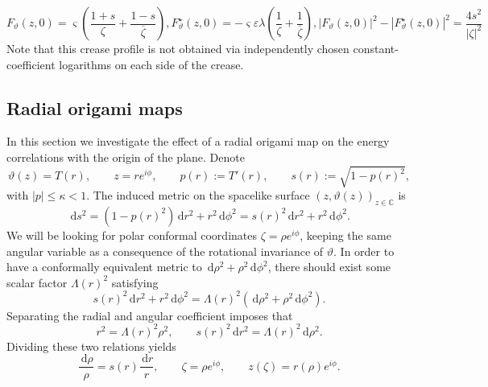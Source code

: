 \documentclass[reqno]{amsart}
\numberwithin{equation}{section}
\theoremstyle{definition}
\theoremstyle{remark}
\providecommand{\dd}{\,\mathrm d}
\begin{document}
\begin{equation}
	 F_\vartheta(z,0)=\varsigma\left(\frac{1+s}{\zeta}+\frac{1-s}{\overline\zeta} \right),  F^\star_\vartheta(z,0)=-\varsigma\varepsilon\lambda\left(
        \frac{1}{\zeta}+\frac{1}{\overline\zeta}\right) ,  |F_\vartheta(z,0)|^2-|F^\star_\vartheta(z,0)|^2
        =\frac{4s^2}{|\zeta|^2}
\end{equation}
Note that this crease profile is not obtained via independently chosen constant-coefficient logarithms on each side of the crease.

\subsection{Radial origami maps} In this section we investigate the effect of a radial origami map on the energy correlations with the origin of the plane. Denote
\begin{equation}\label{eq:radial-profile}
        \vartheta(z)=T(r),
        \qquad z=re^{i\phi},
        \qquad p(r):=T'(r),
        \qquad s(r):=\sqrt{1-p(r)^2},
\end{equation}
with $|p|\leq \kappa<1$.  The induced metric on the spacelike surface $(z,\vartheta(z))_{z\in \mathbb{C}} $ is
\begin{equation}\label{eq:radial-induced-metric}
        \dd s^2=(1-p(r)^2)\dd r^2+r^2\dd\phi^2
        =s(r)^2\dd r^2+r^2\dd\phi^2.
\end{equation}
We will be looking for polar conformal coordinates $\zeta=\rho e^{i\phi}$, keeping the same angular variable as a consequence of the rotational invariance of $\vartheta$. In order to have a conformally equivalent metric to $\dd\rho^2+\rho^2\dd\phi^2$, there should exist some scalar factor $\Lambda(r)^2$ satisfying
\begin{equation}\label{eq:radial-conformal-metric-matching}
        s(r)^2\dd r^2+r^2\dd\phi^2
        =\Lambda(r)^2\left(\dd\rho^2+\rho^2\dd\phi^2\right).
\end{equation}
Separating the radial and angular coefficient imposes that
\begin{equation}\label{eq:radial-rho-derivation}
        r^2=\Lambda(r)^2\rho^2,
        \qquad
        s(r)^2\dd r^2=\Lambda(r)^2\dd\rho^2.
\end{equation}
Dividing these two relations yields
\begin{equation}\label{eq:isothermal-radius}
        \frac{\dd\rho}{\rho}=s(r)\frac{\dd r}{r},
        \qquad
        \zeta=\rho e^{i\phi},
        \qquad
        z(\zeta)=r(\rho)e^{i\phi}.
\end{equation}
\end{document}
